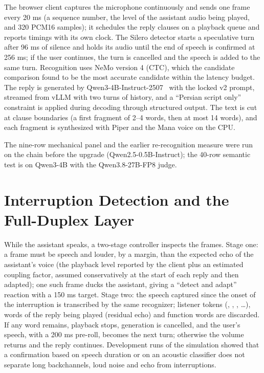 The browser client captures the microphone continuously and sends one frame
every 20 ms (a sequence number, the level of the assistant audio being played,
and 320 PCM16 samples); it schedules the reply clauses on a playback queue and
reports timings with its own clock. The Silero detector starts a speculative turn
after 96 ms of silence and holds its audio until the end of speech is confirmed
at 256 ms; if the user continues, the turn is cancelled and the speech is added
to the same turn. Recognition uses NeMo version 4 (CTC), which the candidate
comparison found to be the most accurate candidate within the latency budget.
The reply is generated by Qwen3-4B-Instruct-2507~\cite{qwen2025qwen3} with the
locked v2 prompt, streamed from vLLM with two turns of history, and a
``Persian script only'' constraint is applied during decoding through
structured output. The text is cut at clause boundaries (a first fragment of 2--4
words, then at most 14 words), and each fragment is synthesized with Piper and
the Mana voice on the CPU.

The nine-row mechanical panel and the earlier re-recognition measure were run on
the chain before the upgrade (Qwen2.5-0.5B-Instruct); the 40-row semantic test
is on Qwen3-4B with the Qwen3.8-27B-FP8 judge.

\section{Interruption Detection and the Full-Duplex Layer}
\label{sec:bargein}

While the assistant speaks, a two-stage controller inspects the frames. Stage
one: a frame must be speech and louder, by a margin, than the expected echo of
the assistant's voice (the playback level reported by the client plus an
estimated coupling factor, assumed conservatively at the start of each reply and
then adapted); one such frame ducks the assistant, giving a ``detect and adapt''
reaction with a 150 ms target. Stage two: the speech captured since the onset of
the interruption is transcribed by the same recognizer; listener tokens
(, , , \ldots), words of the reply being played
(residual echo) and function words are discarded. If any word remains, playback
stops, generation is cancelled, and the user's speech, with a 200 ms pre-roll,
becomes the next turn; otherwise the volume returns and the reply continues.
Development runs of the simulation showed that a confirmation based on speech
duration or on an acoustic classifier does not separate long backchannels, loud
noise and echo from interruptions.


